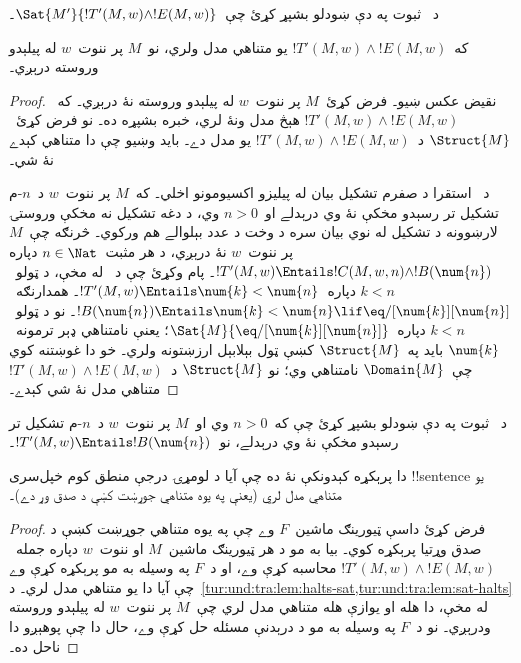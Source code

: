 \documentclass[../../../include/open-logic-section]{subfiles}
\begin{document}
\begin{prob}
  د~ ثبوت په دې ښودلو بشپړ کړئ
  چې~$\Sat{M'}{!T'(M,w) \land !E(M,w)}$۔
\end{prob}

\begin{lem}
  که~$!T'(M,w) \land !E(M,w)$ يو متناهي مدل ولري، نو~$M$ پر
  ننوت~$w$ له پيلېدو وروسته درېږي۔
\end{lem}

\begin{proof}
  نقيض عکس ښيو۔ فرض کړئ~$M$ پر ننوت~$w$ له پيلېدو وروسته نۀ
  درېږي۔ که~$!T'(M,w) \land !E(M,w)$ هېڅ مدل ونۀ لري، خبره بشپړه
  ده۔ نو فرض کړئ~$\Struct{M}$ د~$!T'(M,w) \land !E(M, w)$ يو مدل
  دے۔ بايد وښيو چې دا متناهي کېدے نۀ شي۔

  د~ استقرا د صفرم تشکيل بيان له پيليزو اکسيومونو اخلي۔ که~$M$ پر ننوت~$w$ د~$n$-م تشکيل تر رسېدو مخکې نۀ وي درېدلے او~$n>0$ وي، د دغه تشکيل نه مخکې وروستۍ لارښوونه د تشکيل له نوي بيان سره د وخت د عدد بېلوالے هم ورکوي۔ څرنګه چې~$M$ پر ننوت~$w$ نۀ درېږي، د هر مثبت~$n \in \Nat$ دپاره
  $!T'(M,w) \Entails !C(M, w, n) \land !B(\num{n})$۔ پام وکړئ چې
  د~ له مخې، د ټولو~$k < n$ دپاره~$!T'(M,w)
  \Entails \num{k} < \num{n}$۔ همدارنګه~$!B(\num{n}) \Entails
  \num{k} < \num{n} \lif \eq/[\num{k}][\num{n}]$۔ نو د ټولو~$k <
  n$ دپاره~$\Sat{M}{\eq/[\num{k}][\num{n}]}$؛ يعنې نامتناهي ډېر
  ترمونه~$\num{k}$ بايد په~$\Struct{M}$ کښې ټول بېلابېل ارزښتونه
  ولري۔ خو دا غوښتنه کوي چې~$\Domain{M}$ نامتناهي وي؛ نو
  $\Struct{M}$ د~$!T'(M,w) \land !E(M, w)$ متناهي مدل نۀ شي
  کېدے۔
\end{proof}

\begin{prob}
  د~ ثبوت په دې ښودلو بشپړ کړئ
  چې که~$n>0$ وي او~$M$ پر ننوت~$w$ د~$n$-م تشکيل تر رسېدو مخکې نۀ وي درېدلے، نو~$!T'(M,w) \Entails !B(\num{n})$۔
\end{prob}

\begin{thm}
  دا پرېکړه کېدونکې نۀ ده چې آيا د لومړۍ درجې منطق کوم خپل‌سری
  !!{sentence} يو متناهي مدل لري (يعنې په يوه متناهي جوړښت کښې د
  صدق وړ دے)۔
\end{thm}

\begin{proof}
  فرض کړئ داسې ټيورينګ ماشين~$F$ وے چې په يوه متناهي جوړښت کښې د
  صدق وړتيا پرېکړه کوي۔ بيا به مو د هر ټيورينګ ماشين~$M$ او
  ننوت~$w$ دپاره جمله~$!T'(M,w) \land !E(M,w)$ محاسبه کړې وے، او
  د~$F$ په وسيله به مو پرېکړه کړې وے چې آيا دا يو متناهي مدل لري۔
  د~\cref{tur:und:tra:lem:halts-sat,tur:und:tra:lem:sat-halts} له
  مخې، دا هله او يوازې هله متناهي مدل لري چې~$M$ پر ننوت~$w$ له
  پيلېدو وروسته ودرېږي۔ نو د~$F$ په وسيله به مو د درېدنې مسئله حل
  کړې وے، حال دا چې پوهېږو دا ناحل ده۔
\end{proof}
\end{document}
